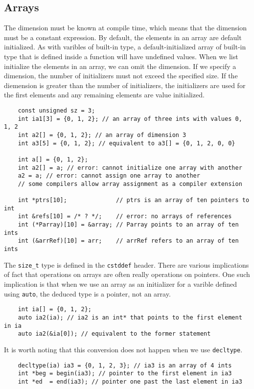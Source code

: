\documentclass[11pt]{ctexart}
\begin{document}
\subsection{Arrays}
The dimension must be known at compile time, which means that the dimension must be a constant expression. By default, the elements in an array are default initialized. As with varibles of built-in type, a default-initialized array of built-in type that is defined inside a function will have undefined values. When we list initialize the elements in an array, we can omit the dimension. If we specify a dimension, the number of initializers must not exceed the specified size. If the diemension is greater than the number of initializers, the initializers are used for the first elements and any remaining elements are value initialized.
\begin{lstlisting}
    const unsigned sz = 3;
    int ia1[3] = {0, 1, 2}; // an array of three ints with values 0, 1, 2
    int a2[] = {0, 1, 2}; // an array of dimension 3
    int a3[5] = {0, 1, 2}; // equivalent to a3[] = {0, 1, 2, 0, 0}

    int a[] = {0, 1, 2};
    int a2[] = a; // error: cannot initialize one array with another
    a2 = a; // error: cannot assign one array to another
    // some compilers allow array assignment as a compiler extension

    int *ptrs[10];              // ptrs is an array of ten pointers to int
    int &refs[10] = /* ? */;    // error: no arrays of references
    int (*Parray)[10] = &array; // Parray points to an array of ten ints
    int (&arrRef)[10] = arr;    // arrRef refers to an array of ten ints
\end{lstlisting}
The \verb|size_t| type is defined in the \verb|cstddef| header. There are various implications of fact that operations on arrays are often really operations on pointers. One such implication is that when we use an array as an initializer for a varible defined using \verb|auto|, the deduced type is a pointer, not an array.
\begin{lstlisting}
    int ia[] = {0, 1, 2};
    auto ia2(ia); // ia2 is an int* that points to the first element in ia
    auto ia2(&ia[0]); // equivalent to the former statement
\end{lstlisting}
It is worth noting that this conversion does not happen when we use \verb|decltype|.
\begin{lstlisting}
    decltype(ia) ia3 = {0, 1, 2, 3}; // ia3 is an array of 4 ints
    int *beg = begin(ia3); // pointer to the first element in ia3
    int *ed  = end(ia3); // pointer one past the last element in ia3
\end{lstlisting}
\end{document}
